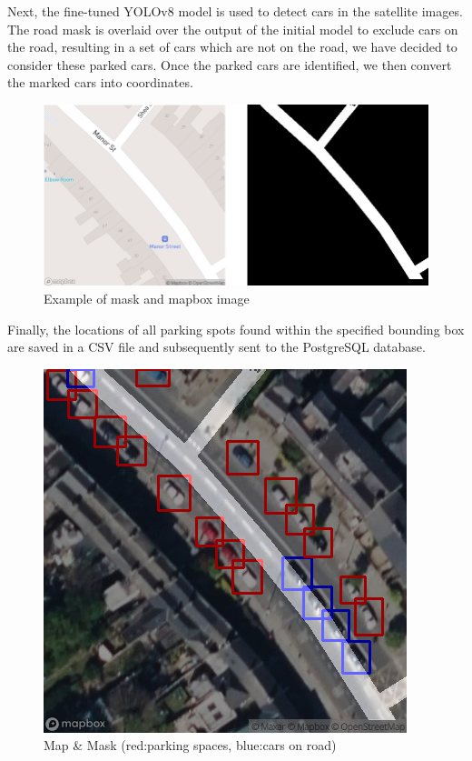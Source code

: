 \noindent{}Next, the fine-tuned YOLOv8 model is used to detect cars in the
satellite images. The road mask is overlaid over the output of the initial model
to exclude cars on the road, resulting in a set of cars which are not on the
road, we have decided to consider these parked cars. Once the parked cars are
identified, we then convert the marked cars into coordinates.

\begin{figure}[h]
    \centering
    \includegraphics[width=\columnwidth]{images/mask_and_mapbox.png}
    \caption{Example of mask and mapbox image}
    \label{fig:mask_and_mapbox}
\end{figure}

\noindent{}Finally, the locations of all parking spots found within the
specified bounding box are saved in a CSV file and subsequently sent to the
PostgreSQL database.

\begin{figure}[h]
    \centering
    \includegraphics[width=0.65\columnwidth]{images/opacity_mask.png}
    \caption{Map \& Mask (red:parking spaces, blue:cars on road)}
    \label{fig:parking_detection}
\end{figure}

